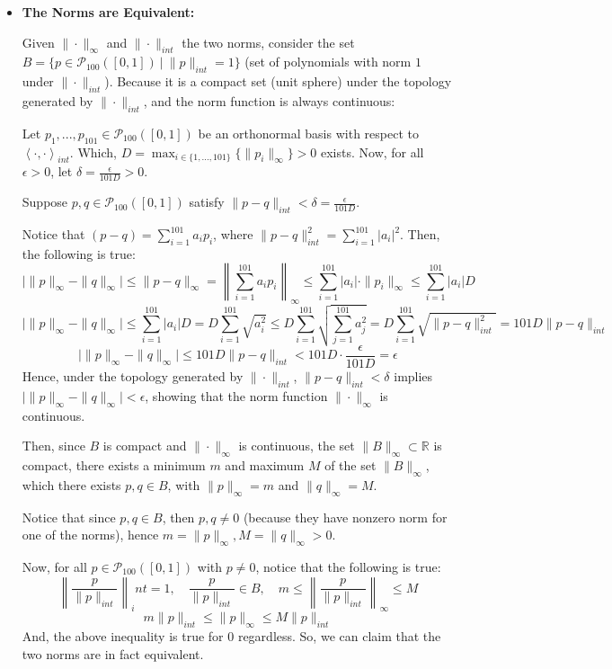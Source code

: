 \documentclass{article}
\begin{document}
\begin{itemize}
\begin{itemize}
        \item \textbf{The Norms are Equivalent:}
        
        Given $\|\cdot\|_{\infty}$ and $\|\cdot\|_{int}$ the two norms, consider the set $B=\{p\in\mathcal{P}_{100}([0,1])\ |\ \|p\|_{int} =1\}$ (set of polynomials with norm $1$ under $\|\cdot\|_{int}$). Because it is a compact set (unit sphere) under the topology generated by $\|\cdot\|_{int}$,
        and the norm function is always continuous:
        
        \hfill

        Let $p_1,...,p_{101}\in\mathcal{P}_{100}([0,1])$ be an orthonormal basis with respect to $\left<\cdot,\cdot\right>_{int}$.
        Which, $D=\max_{i\in\{1,...,101\}}\{\|p_i\|_\infty\}>0$ exists. 
        Now, for all $\epsilon >0$, let $\delta = \frac{\epsilon}{101D}>0$. 
        
        Suppose $p,q\in \mathcal{P}_{100}([0,1])$ satisfy $\|p-q\|_{int}<\delta = \frac{\epsilon}{101D}$.

        Notice that $(p-q)=\sum_{i=1}^{101}a_ip_i$, where $\|p-q\|_{int}^2=\sum_{i=1}^{101}|a_i|^2$. Then, the following is true:
        $$\bigg|\|p\|_\infty-\|q\|_\infty\bigg| \leq \|p-q\|_\infty = \left\|\sum_{i=1}^{101}a_ip_i\right\|_\infty\leq \sum_{i=1}^{101}|a_i|\cdot\|p_i\|_\infty \leq \sum_{i=1}^{101}|a_i|D$$
        $$\bigg|\|p\|_\infty-\|q\|_\infty\bigg| \leq \sum_{i=1}^{101}|a_i|D = D\sum_{i=1}^{101}\sqrt{a_i^2} \leq D\sum_{i=1}^{101}\sqrt{\sum_{j=1}^{101}a_j^2} = D\sum_{i=1}^{101}\sqrt{\|p-q\|_{int}^2} = 101D\|p-q\|_{int}$$
        $$\bigg|\|p\|_\infty-\|q\|_\infty\bigg|\leq 101D\|p-q\|_{int} < 101D\cdot\frac{\epsilon}{101D} = \epsilon$$
        Hence, under the topology generated by $\|\cdot\|_{int}$, $\|p-q\|_{int}<\delta$ implies $\bigg|\|p\|_\infty-\|q\|_\infty\bigg|<\epsilon$, showing that the norm function $\|\cdot\|_\infty$ is continuous.

        \hfill

        Then, since $B$ is compact and $\|\cdot\|_\infty$ is continuous, the set $\|B\|_{\infty} \subset \mathbb{R}$ is compact, there exists a minimum $m$ and maximum $M$ of the set $\|B\|_{\infty}$, which there exists $p,q\in B$, with $\|p\|_{\infty}=m$ and $\|q\|_{\infty}=M$.

        Notice that since $p,q\in B$, then $p,q\neq 0$ (because they have nonzero norm for one of the norms), hence $m=\|p\|_{\infty},M=\|q\|_{\infty}>0$.

        Now, for all $p\in \mathcal{P}_{100}([0,1])$ with $p\neq 0$, notice that the following is true:
        $$\left\|\frac{p}{\|p\|_{int}}\right\|_int = 1,\quad \frac{p}{\|p\|_{int}}\in B,\quad m\leq \left\|\frac{p}{\|p\|_{int}}\right\|_{\infty}\leq M$$
        $$m\|p\|_{int}\leq \|p\|_\infty\leq M\|p\|_{int}$$
        And, the above inequality is true for $0$ regardless. So, we can claim that the two norms are in fact equivalent.


\end{itemize}
\end{itemize}
\end{document}
